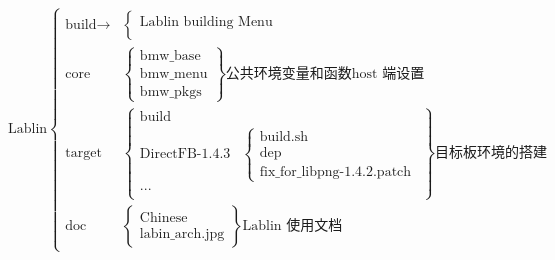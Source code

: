 \documentclass[a4paper,11pt]{article}
\begin{document}
\begin{CJK*}{UTF8}{gbsn}
\begin{equation*}
	\text{Lablin}
    \left\{
        \begin{aligned}
            \text{build$\rightarrow$}&
			\left\{
				\begin{aligned}
				\text{Lablin building Menu}\\ 
				\end{aligned}
			\right.\\
            \text{core} &
            \left\{
                \begin{aligned}
                    \text{bmw\_base}\\
                    \text{bmw\_menu}\\
					\text{bmw\_pkgs}
                \end{aligned}
            \right\}
			\text{公共环境变量和函数host~端设置}\\
            \text{target} &
            \left\{
                \begin{aligned}
                    \text{build}\\
                    \text{DirectFB-1.4.3} &
					\left\{
						\begin{aligned}
							\text{build.sh}\\
							\text{dep}\\
							\text{fix\_for\_libpng-1.4.2.patch}
						\end{aligned}
					\right.\\
					\text{...}\\
                \end{aligned}
            \right\}
			\text{目标板环境的搭建}\\
            \text{doc} &
            \left\{
                \begin{aligned}
                    \text{Chinese}\\
                    \text{labin\_arch.jpg}
                \end{aligned}
            \right\}
			\text{Lablin~使用文档}
        \end{aligned}
    \right.
\end{equation*}



\end{CJK*}
\end{document}
